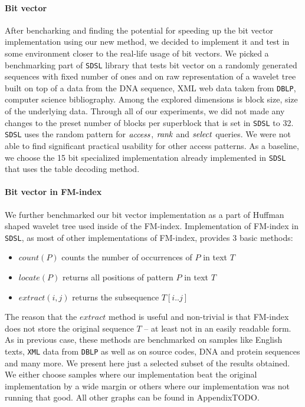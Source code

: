 \paragraph{Bit vector}

After bencharking and finding the potential for speeding up the bit vector implementation using
our new method, we decided to implement it and test in some environment closer to the real-life
usage of bit vectors. We picked a benchmarking part of \texttt{SDSL} library that tests bit vector
on a randomly generated sequences with fixed number of ones and on raw representation of a wavelet
tree built on top of a data from the DNA sequence, XML web data taken from \texttt{DBLP}, computer
science bibliography. Among the explored dimensions is block size, size of the underlying data.
Through all of our experiments, we did not made any changes to the preset number of blocks per
superblock that is set in \texttt{SDSL} to 32. \texttt{SDSL} uses the random pattern for $\mathit{access}$,
$\mathit{rank}$ and $\mathit{select}$ queries. We were not able to find significant practical usability for other
access patterns. As a baseline, we choose the 15 bit specialized implementation already implemented
in \texttt{SDSL} that uses the table decoding method.

\paragraph{Bit vector in FM-index}

We further benchmarked our bit vector implementation as a part of Huffman shaped wavelet tree
used inside of the FM-index. Implementation of FM-index in \texttt{SDSL}, as most of other
implementations of FM-index, provides 3 basic methods:

\begin{itemize}
	\item $\mathit{count}(P)$ counts the number of occurrences of $P$ in text $T$
	\item $\mathit{locate}(P)$ returns all positions of pattern $P$ in text $T$
	\item $\mathit{extract}(i, j)$ returns the subsequence $T[i..j]$
\end{itemize}

The reason that the $\mathit{extract}$ method is useful and non-trivial is that FM-index
does not store the original sequence $T$ -- at least not in an easily readable form.
As in previous case, these methods are benchmarked on samples like English texts, \texttt{XML}
data from \texttt{DBLP} as well as on source codes, DNA and protein sequences and many more.
We present here just a selected subset of the results obtained. We either choose samples
where our implementation beat the original implementation by a wide margin or others where
our implementation was not running that good. All other graphs can be found in AppendixTODO.